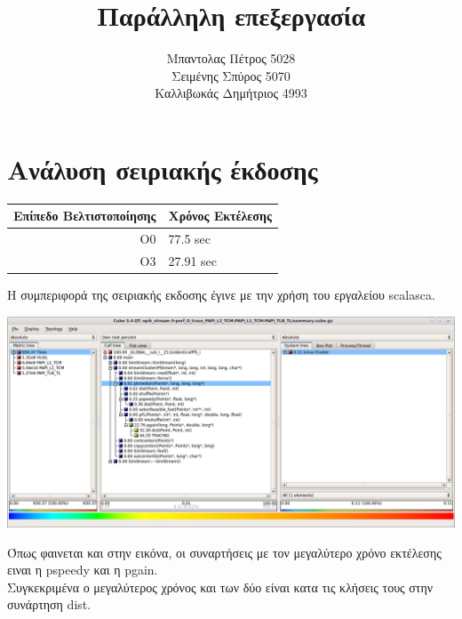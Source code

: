 \documentclass{article}
\title{Παράλληλη επεξεργασία}
\author{Μπαντολας Πέτρος 5028\\Σειμένης Σπύρος 5070\\Καλλιβωκάς Δημήτριος 4993}
\begin{document}
\maketitle
\section{Ανάλυση σειριακής έκδοσης}

\begin{center}
\begin{tabular}{|r|l|}
    \hline
    Επίπεδο Βελτιστοποίησης & Χρόνος Εκτέλεσης \\ \hline
    O0 & 77.5 sec \\
    O3 & 27.91 sec \\ \hline
\end{tabular}
\end{center}

Η συμπεριφορά της σειριακής εκδοσης έγινε με την χρήση του εργαλείου scalasca.
\begin{center}
\includegraphics[scale=0.5]{../scrshots/time.png}
\end{center} 
Όπως φαινεται και στην εικόνα, οι συναρτήσεις με τον μεγαλύτερο χρόνο εκτέλεσης ειναι η pspeedy και η pgain.\\
Συγκεκριμένα ο μεγαλύτερος χρόνος και των δύο είναι κατα τις κλήσεις τους στην συνάρτηση dist.
\end{document}

